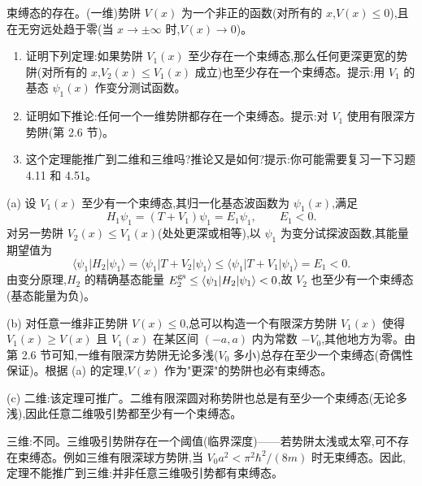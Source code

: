 \begin{question}
束缚态的存在。(一维)势阱 $V(x)$ 为一个非正的函数(对所有的 $x$,$V(x)\le0$),且在无穷远处趋于零(当 $x\to\pm\infty$ 时,$V(x)\to0$)。
\begin{enumerate}
\item 证明下列定理:如果势阱 $V_1(x)$ 至少存在一个束缚态,那么任何更深更宽的势阱(对所有的 $x$,$V_2(x)\le V_1(x)$ 成立)也至少存在一个束缚态。提示:用 $V_1$ 的基态 $\psi_1(x)$ 作变分测试函数。
\item 证明如下推论:任何一个一维势阱都存在一个束缚态。提示:对 $V_1$ 使用有限深方势阱(第 2.6 节)。
\item 这个定理能推广到二维和三维吗?推论又是如何?提示:你可能需要复习一下习题 4.11 和 4.51。
\end{enumerate}
\end{question}
\begin{solution}
(a) 设 $V_1(x)$ 至少有一个束缚态,其归一化基态波函数为 $\psi_1(x)$,满足
\[
H_1\psi_1=(T+V_1)\psi_1=E_1\psi_1,\qquad E_1<0.
\]
对另一势阱 $V_2(x)\le V_1(x)$(处处更深或相等),以 $\psi_1$ 为变分试探波函数,其能量期望值为
\[
\langle\psi_1|H_2|\psi_1\rangle=\langle\psi_1|T+V_2|\psi_1\rangle
\le\langle\psi_1|T+V_1|\psi_1\rangle=E_1<0.
\]
由变分原理,$H_2$ 的精确基态能量 $E_2^{\rm gs}\le\langle\psi_1|H_2|\psi_1\rangle<0$,故 $V_2$ 也至少有一个束缚态(基态能量为负)。

(b) 对任意一维非正势阱 $V(x)\le0$,总可以构造一个有限深方势阱 $V_1(x)$ 使得 $V_1(x)\ge V(x)$ 且 $V_1(x)$ 在某区间 $(-a,a)$ 内为常数 $-V_0$,其他地方为零。由第 2.6 节可知,一维有限深方势阱无论多浅($V_0$ 多小)总存在至少一个束缚态(奇偶性保证)。根据 (a) 的定理,$V(x)$ 作为"更深"的势阱也必有束缚态。

(c) 二维:该定理可推广。二维有限深圆对称势阱也总是有至少一个束缚态(无论多浅),因此任意二维吸引势都至少有一个束缚态。

三维:不同。三维吸引势阱存在一个阈值(临界深度)——若势阱太浅或太窄,可不存在束缚态。例如三维有限深球方势阱,当 $V_0 a^2<\pi^2\hbar^2/(8m)$ 时无束缚态。因此,定理不能推广到三维:并非任意三维吸引势都有束缚态。
\end{solution}

